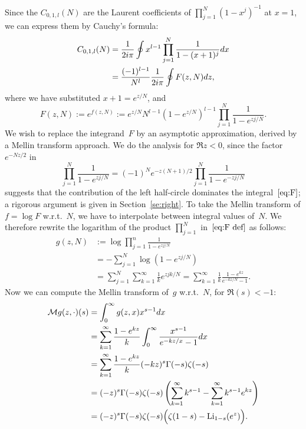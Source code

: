 \documentclass[a4paper]{amsart}
\begin{document}
Since the $C_{0,1,l}(N)$ are the Laurent coefficients of
$\prod_{j=1}^N (1-x^j)^{-1}$ at $x=1$, we
can express them by Cauchy's formula:
\begin{align}
   C_{0,1,l}(N) &= \frac{1}{2i\pi} \oint x^{l-1} \prod_{j=1}^N \frac{1}{1-(x+1)^j}dx \notag \\
   & =  \frac{(-1)^{l-1}}{N^l} \frac{1}{2i\pi} \oint F(z,N) dz, \label{eq:F}
\end{align}
where we have substituted $x+1=e^{z/N}$, and
\begin{equation}\label{eq:F def}
  F(z,N) := e^{f(z,N)} := e^{z/N}N^{l-1}(1-e^{z/N})^{l-1}\prod_{j=1}^N \frac{1}{1-e^{zj/N}}.
\end{equation}
We wish to replace the integrand~$F$ by an asymptotic approximation, 
derived by a Mellin transform approach.
We do the analysis for $\Re z<0$, since the factor~$e^{-Nz/2}$ in
\begin{equation}\label{eq:refl}
  \prod_{j=1}^N \frac 1{1-e^{zj/N}} 
  = (-1)^N e^{-z(N+1)/2} \prod_{j=1}^N \frac 1{1-e^{-zj/N}}
\end{equation}
suggests that the contribution of the left half-circle dominates
the integral~$\ref{eq:F}$; a rigorous argument is given in Section~\ref{se:right}.
To take the Mellin transform of $f=\log F$ w.r.t.~$N$, we have to interpolate between integral values of~$N$. We therefore rewrite the
logarithm of the product $\prod_{j=1}^N$ in~$\ref{eq:F def}$ as follows:
\begin{align*}
 g(z,N)  &:= \log \prod_{j=1}^n  \frac{1}{1-e^{zj/N}} \\ 
 &= - \sum_{j=1}^N \log(1-e^{zj/N}) \\
  &= \sum_{j=1}^N \sum_{k=1}^\infty \frac{1}{k}e^{zjk/N} 
 = \sum_{k=1}^\infty \frac{1}{k} \frac{1-e^{kz}}{e^{-kz/N}-1}.
\end{align*}
Now we can compute the Mellin transform of~$g$ w.r.t.~$N$, for $\Re(s)<-1$:
\begin{align}
 \mathcal{M}g(z,\cdot)(s)&=\int_0^\infty g(z,x)x^{s-1}dx \notag \\
&=  \sum_{k=1}^\infty \frac{1-e^{kz}}{k}
    \int_0^\infty \frac{x^{s-1}}{e^{-kz/x}-1} dx \notag \\
  &= \sum_{k=1}^\infty  \frac{1-e^{kz}}{k} (-kz)^s \Gamma(-s)\zeta(-s) \notag \\
  &= (-z)^s \Gamma(-s)\zeta(-s) \left(\sum_{k=1}^\infty k^{s-1}
  - \sum_{k=1}^\infty  k^{s-1} e^{kz}  \right) \notag \\
  &= (-z)^s \Gamma(-s)\zeta(-s) \Big(\zeta(1-s) - \mathrm{Li}_{1-s}(e^z)\Big).
  \label{eq:mellin}
\end{align}
\end{document}

